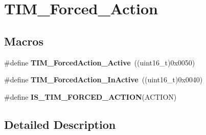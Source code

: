 \hypertarget{group___t_i_m___forced___action}{\section{T\-I\-M\-\_\-\-Forced\-\_\-\-Action}
\label{group___t_i_m___forced___action}
}
\subsection*{Macros}
\begin{DoxyCompactItemize}
\item 
\hypertarget{group___t_i_m___forced___action_ga19d3769825f1dfdbdbde3edb60310b99}{\#define {\bfseries T\-I\-M\-\_\-\-Forced\-Action\-\_\-\-Active}~((uint16\-\_\-t)0x0050)}\label{group___t_i_m___forced___action_ga19d3769825f1dfdbdbde3edb60310b99}

\item 
\hypertarget{group___t_i_m___forced___action_ga79656f2193ec5e12a15d0ae5b025d273}{\#define {\bfseries T\-I\-M\-\_\-\-Forced\-Action\-\_\-\-In\-Active}~((uint16\-\_\-t)0x0040)}\label{group___t_i_m___forced___action_ga79656f2193ec5e12a15d0ae5b025d273}

\item 
\#define {\bfseries I\-S\-\_\-\-T\-I\-M\-\_\-\-F\-O\-R\-C\-E\-D\-\_\-\-A\-C\-T\-I\-O\-N}(A\-C\-T\-I\-O\-N)
\end{DoxyCompactItemize}


\subsection{Detailed Description}


